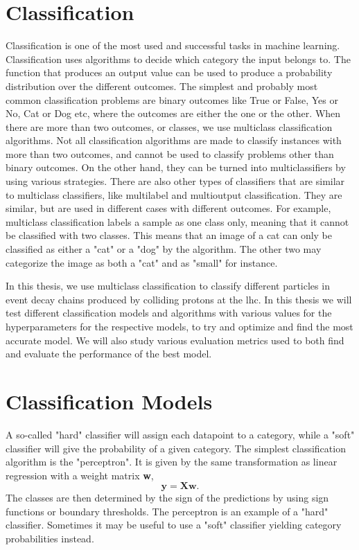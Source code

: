 \documentclass[a4paper, american, 12pt]{report}
\begin{document}
	\section{Classification}
	\label{sect:Theory-Classification}
	Classification is one of the most used and successful tasks in machine learning. Classification uses algorithms to decide which category the input belongs to. The function that produces an output value can be used to produce a probability distribution over the different outcomes. The simplest and probably most common classification problems are binary outcomes like True or False, Yes or No, Cat or Dog etc, where the outcomes are either the one or the other. When there are more than two outcomes, or classes, we use multiclass classification algorithms. Not all classification algorithms are made to classify instances with more than two outcomes, and cannot be used to classify problems other than binary outcomes. On the other hand, they can be turned into multiclassifiers by using various strategies. There are also other types of classifiers that are similar to multiclass classifiers, like multilabel and multioutput classification. They are similar, but are used in different cases with different outcomes. For example, multiclass classification labels a sample as one class only, meaning that it cannot be classified with two classes. This means that an image of a cat can only be classified as either a "cat" or a "dog" by the algorithm. The other two may categorize the image as both a "cat" and as "small" for instance.
	
	In this thesis, we use multiclass classification to classify different particles in event decay chains produced by colliding protons at the \acrshort{lhc}. In this thesis we will test different classification models and algorithms with various values for the hyperparameters for the respective models, to try and optimize and find the most accurate model. We will also study various evaluation metrics used to both find and evaluate the performance of the best model.
	
	
	\section{Classification Models}
	\label{sect:Theory-ClassModels}
	 A so-called "hard" classifier will assign each datapoint to a category, while a "soft" classifier will give the probability of a given category. The simplest classification algorithm is the "perceptron". It is given by the same transformation as linear regression with a weight matrix \textbf{w},
	 \begin{equation}
	 \label{eq:Perceptron}
	 	\textbf{y}=\textbf{X}\textbf{w}.
	 \end{equation}	 
	 The classes are then determined by the sign of the predictions by using sign functions or boundary thresholds. The perceptron is an example of a "hard" classifier. Sometimes it may be useful to use a "soft" classifier yielding category probabilities instead. 
	 
\end{document}
